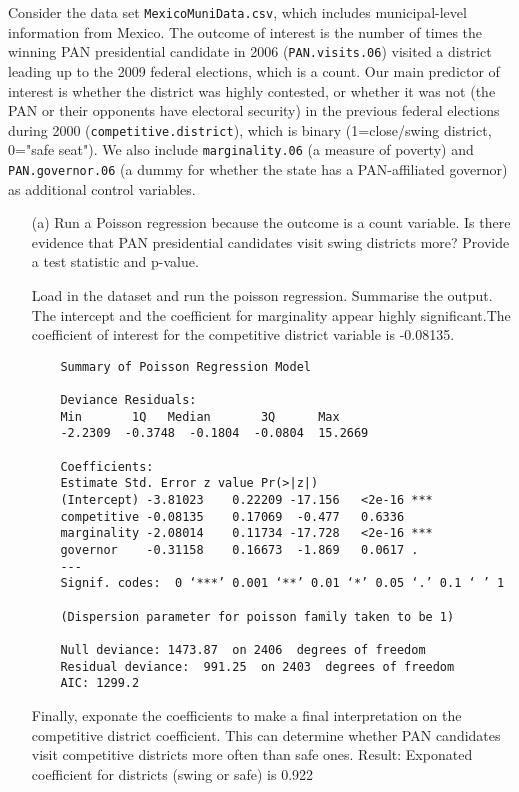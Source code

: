 \documentclass[12pt,letterpaper]{article}
\begin{document}
\noindent Consider the data set \texttt{MexicoMuniData.csv}, which includes municipal-level information from Mexico. The outcome of interest is the number of times the winning PAN presidential candidate in 2006 (\texttt{PAN.visits.06}) visited a district leading up to the 2009 federal elections, which is a count. Our main predictor of interest is whether the district was highly contested, or whether it was not (the PAN or their opponents have electoral security) in the previous federal elections during 2000 (\texttt{competitive.district}), which is binary (1=close/swing district, 0="safe seat"). We also include \texttt{marginality.06} (a measure of poverty) and \texttt{PAN.governor.06} (a dummy for whether the state has a PAN-affiliated governor) as additional control variables. 

\begin{enumerate}
	\item [(a)]
	Run a Poisson regression because the outcome is a count variable. Is there evidence that PAN presidential candidates visit swing districts more? Provide a test statistic and p-value.

Load in the dataset and run the poisson regression. Summarise the output. The intercept and the coefficient for marginality appear highly significant.The coefficient of interest for the competitive district variable is -0.08135. 

	 
	
\begin{verbatim}
	Summary of Poisson Regression Model
	
	Deviance Residuals: 
	Min       1Q   Median       3Q      Max  
	-2.2309  -0.3748  -0.1804  -0.0804  15.2669  
	
	Coefficients:
	Estimate Std. Error z value Pr(>|z|)    
	(Intercept) -3.81023    0.22209 -17.156   <2e-16 ***
	competitive -0.08135    0.17069  -0.477   0.6336    
	marginality -2.08014    0.11734 -17.728   <2e-16 ***
	governor    -0.31158    0.16673  -1.869   0.0617 .  
	---
	Signif. codes:  0 ‘***’ 0.001 ‘**’ 0.01 ‘*’ 0.05 ‘.’ 0.1 ‘ ’ 1
	
	(Dispersion parameter for poisson family taken to be 1)
	
	Null deviance: 1473.87  on 2406  degrees of freedom
	Residual deviance:  991.25  on 2403  degrees of freedom
	AIC: 1299.2
\end{verbatim}	

Finally, exponate the coefficients to make a final interpretation on the competitive district coefficient. This can determine whether PAN candidates visit competitive districts more often than safe ones. Result: Exponated coefficient for districts (swing or safe) is 0.922


\end{enumerate}
\end{document}
